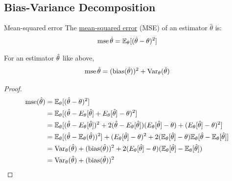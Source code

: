 \documentclass[../Main.tex]{subfiles}
\begin{document}
\subsection{Bias-Variance Decomposition}
\begin{definition}{Mean-squared error}
    The \underline{mean-squared error} (MSE) of an estimator $\hat{\theta}$ is:
    \begin{equation*}
        \operatorname{mse}{\hat{\theta}} = \mathbb{E}_\theta[(\hat{\theta} - \theta)^2]
    \end{equation*}
\end{definition}
\begin{proposition}
    For an estimator $\hat{\theta}$ like above,
    \begin{equation*}
        \operatorname{mse}{\hat{\theta}} = (\operatorname{bias}(\hat{\theta}))^2 + \operatorname{Var}_\theta (\hat{\theta})
    \end{equation*}
    \label{propBiasVarDecomp}
\end{proposition}
\begin{proof}
    \begin{align*}
        \operatorname{mse}(\hat{\theta}) &= \mathbb{E}_\theta[(\hat{\theta} - \theta)^2] \\
        &= \mathbb{E}_\theta[(\hat{\theta} - E_\theta[\hat{\theta}] + E_\theta[\hat{\theta}] - \theta)^2] \\
        &= \mathbb{E}_\theta[(\hat{\theta} - E_\theta[\hat{\theta}])^2 + 2(\hat{\theta} - E_\theta[\hat{\theta}])(E_\theta[\hat{\theta}] - \theta) + (E_\theta[\hat{\theta}] - \theta)^2] \\
        &= \mathbb{E}_\theta[(\hat{\theta} - \mathbb{E}_\theta(\hat{\theta}))^2] + (E_\theta[\hat{\theta}] - \theta)^2 + 2(\mathbb{E}_{\theta}[\hat{\theta}] - \theta) \mathbb{E}_\theta[\hat{\theta} - \mathbb{E}_\theta[\hat{\theta}]] \\
        &= \operatorname{Var}_\theta(\hat{\theta}) + (\operatorname{bias}(\hat{\theta}))^2 + 2(E_\theta[\hat{\theta}] - \theta) (\mathbb{E}_\theta[\hat{\theta}] - \mathbb{E}_\theta[\hat{\theta}]) \\
        &= \operatorname{Var}_\theta(\hat{\theta}) + (\operatorname{bias}(\hat{\theta}))^2 
    \end{align*}
\end{proof}
\end{document}
